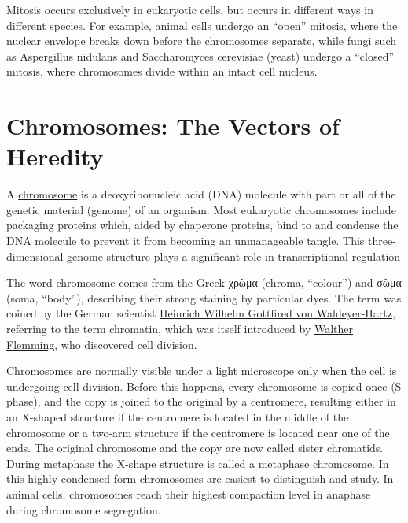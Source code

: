 Mitosis occurs exclusively in eukaryotic cells, but occurs in different ways in different species. For example, animal cells undergo an ``open'' mitosis, where the nuclear envelope breaks down before the chromosomes separate, while fungi such as Aspergillus nidulans and Saccharomyces cerevisiae (yeast) undergo a ``closed'' mitosis, where chromosomes divide within an intact cell nucleus.

\hypertarget{chromosomes-the-vectors-of-heredity}{%
\section{Chromosomes: The Vectors of Heredity}\label{chromosomes-the-vectors-of-heredity}}

A \href{https://en.wikipedia.org/wiki/Chromosome}{chromosome} is a deoxyribonucleic acid (DNA) molecule with part or all of the genetic material (genome) of an organism. Most eukaryotic chromosomes include packaging proteins which, aided by chaperone proteins, bind to and condense the DNA molecule to prevent it from becoming an unmanageable tangle. This three-dimensional genome structure plays a significant role in transcriptional regulation

The word chromosome comes from the Greek χρῶμα (chroma, ``colour'') and σῶμα (soma, ``body''), describing their strong staining by particular dyes. The term was coined by the German scientist \href{https://en.wikipedia.org/wiki/Heinrich_Wilhelm_Gottfried_von_Waldeyer-Hartz}{Heinrich Wilhelm Gottfired von Waldeyer-Hartz}, referring to the term chromatin, which was itself introduced by \href{https://en.wikipedia.org/wiki/Walther_Flemming}{Walther Flemming}, who discovered cell division.

Chromosomes are normally visible under a light microscope only when the cell is undergoing cell division. Before this happens, every chromosome is copied once (S phase), and the copy is joined to the original by a centromere, resulting either in an X-shaped structure if the centromere is located in the middle of the chromosome or a two-arm structure if the centromere is located near one of the ends. The original chromosome and the copy are now called sister chromatids. During metaphase the X-shape structure is called a metaphase chromosome. In this highly condensed form chromosomes are easiest to distinguish and study. In animal cells, chromosomes reach their highest compaction level in anaphase during chromosome segregation.



